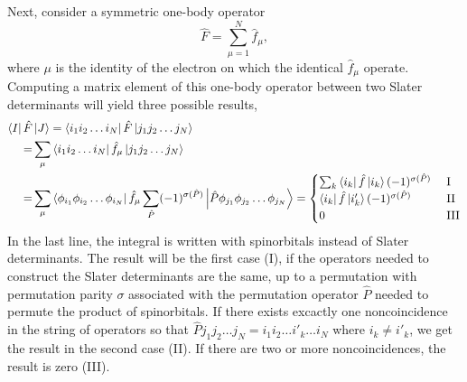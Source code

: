 Next, consider a symmetric one-body operator
\begin{equation}
    \hat{F} = \sum_{\mu = 1}^N \hat{f}_\mu,
\end{equation}
where $\mu$ is the identity of the electron on which the identical $\hat{f}_\mu$ operate.
Computing a matrix element of this one-body operator between two Slater determinants
will yield three possible results,
\begin{equation}
    \begin{aligned}
        \bra{I} \hat{F}& \ket{J} 
            = \bra{i_1 i_2 \dots i_N} \hat{F} \ket{j_1 j_2 \dots j_N} \\
        =& \sum_\mu \bra{i_1 i_2 \dots i_N} \hat{f}_\mu \ket{j_1 j_2 \dots j_N} \\
        =& \sum_\mu \bra{\phi_{i_1} \phi_{i_2} \dots \phi_{i_N}}
            \hat{f}_\mu \sum_{\hat{P}} (-1)^{\sigma(\hat{P})}
            \ket{\hat{P} \phi_{j_1} \phi_{j_2} \dots \phi_{j_N}}
        =
        \begin{cases}
           \sum_k \bra{i_k} \hat{f} \ket{i_k}(-1)^{\sigma(\hat{P})} &\ \text{I} \\
           \bra{i_k} \hat{f} \ket{i'_k}(-1)^{\sigma(\hat{P})} &\ \text{II} \\
           0 &\ \text{III}
        \end{cases}
    \end{aligned}
\end{equation}
In the last line, the integral is written with spinorbitals instead of Slater determinants.
The result will be the first case (I), if the operators needed to construct the Slater 
determinants are the same, up to a permutation with permutation parity $\sigma$ associated
with the permutation operator $\hat{P}$ needed to permute the product of spinorbitals. If there exists
excactly one noncoincidence in the string of operators so that 
$\hat{P} j_1 j_2 \dots j_N = i_1 i_2 \dots i'_k \dots i_N$ where $i_k \neq i'_k$, we get
the result in the second case (II). If there are two or more noncoincidences, the result
is zero (III).

